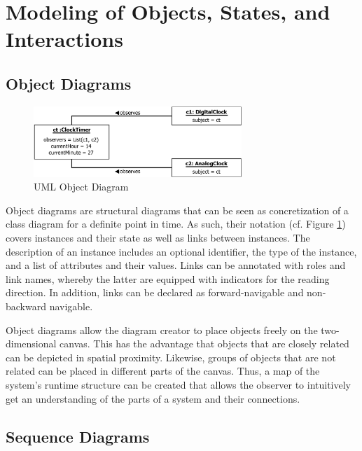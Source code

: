 \section{Modeling of Objects, States, and Interactions}
\label{s:BackgroundModeling}

\subsection{Object Diagrams}
\label{ss:BackgroundModelingObject}

\begin{figure}
	\centering
	\includegraphics[width=0.7\textwidth]{../images/02-Object}
	\caption[TOC Caption]{UML Object Diagram}
	\label{fig:ModelingObject}
\end{figure}

Object diagrams \cite{rumbaugh_unified_2010} are structural diagrams that can be seen as concretization of a class diagram for a definite point in time.
As such, their notation (cf. Figure \ref{fig:ModelingObject}) covers instances and their state as well as links between instances.
The description of an instance includes an optional identifier, the type of the instance, and a list of attributes and their values.
Links can be annotated with roles and link names, whereby the latter are equipped with indicators for the reading direction.
In addition, links can be declared as forward-navigable and non-backward navigable.

Object diagrams allow the diagram creator to place objects freely on the two-dimensional canvas.
This has the advantage that objects that are closely related can be depicted in spatial proximity.
Likewise, groups of objects that are not related can be placed in different parts of the canvas.
Thus, a map of the system's runtime structure can be created that allows the observer to intuitively get an understanding of the parts of a system and their connections.

\subsection{Sequence Diagrams}
\label{ss:BackgroundModelingSequence}

